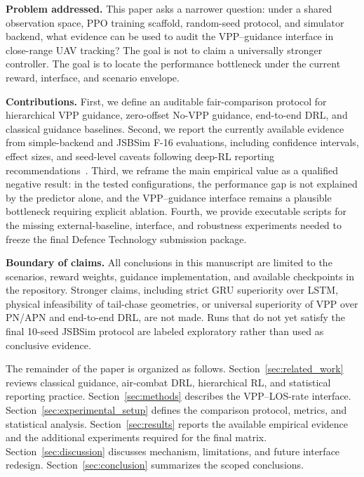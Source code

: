 \textbf{Problem addressed.} This paper asks a narrower question: under a shared observation space, PPO training scaffold, random-seed protocol, and simulator backend, what evidence can be used to audit the VPP--guidance interface in close-range UAV tracking? The goal is not to claim a universally stronger controller. The goal is to locate the performance bottleneck under the current reward, interface, and scenario envelope.

\textbf{Contributions.} First, we define an auditable fair-comparison protocol for hierarchical VPP guidance, zero-offset No-VPP guidance, end-to-end DRL, and classical guidance baselines. Second, we report the currently available evidence from simple-backend and JSBSim F-16 evaluations, including confidence intervals, effect sizes, and seed-level caveats following deep-RL reporting recommendations~\cite{henderson2018deep,patterson2023empirical}. Third, we reframe the main empirical value as a qualified negative result: in the tested configurations, the performance gap is not explained by the predictor alone, and the VPP--guidance interface remains a plausible bottleneck requiring explicit ablation. Fourth, we provide executable scripts for the missing external-baseline, interface, and robustness experiments needed to freeze the final Defence Technology submission package.

\textbf{Boundary of claims.} All conclusions in this manuscript are limited to the scenarios, reward weights, guidance implementation, and available checkpoints in the repository. Stronger claims, including strict GRU superiority over LSTM, physical infeasibility of tail-chase geometries, or universal superiority of VPP over PN/APN and end-to-end DRL, are not made. Runs that do not yet satisfy the final 10-seed JSBSim protocol are labeled exploratory rather than used as conclusive evidence.

The remainder of the paper is organized as follows. Section~\ref{sec:related_work} reviews classical guidance, air-combat DRL, hierarchical RL, and statistical reporting practice. Section~\ref{sec:methods} describes the VPP--LOS-rate interface. Section~\ref{sec:experimental_setup} defines the comparison protocol, metrics, and statistical analysis. Section~\ref{sec:results} reports the available empirical evidence and the additional experiments required for the final matrix. Section~\ref{sec:discussion} discusses mechanism, limitations, and future interface redesign. Section~\ref{sec:conclusion} summarizes the scoped conclusions.
